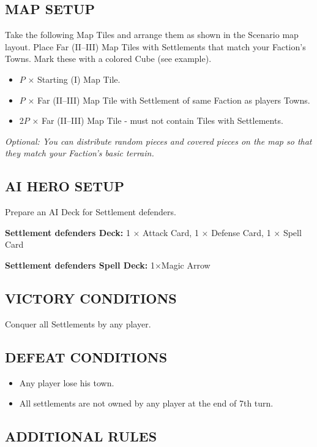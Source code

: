 \begin{multicols}{2}
\subsection*{\MakeUppercase{Map Setup}}

Take the following Map Tiles and arrange them as shown in the Scenario map layout.
Place Far (II--III) Map Tiles with Settlements that match your Faction's Towns. Mark these with a colored Cube (see example).

\begin{itemize}
  \item $P$ × Starting (I) Map Tile.
  \item $P$ × Far (II--III) Map Tile with Settlement of same Faction as players Towns.
  \item 2$P$ × Far (II--III) Map Tile - must not contain Tiles with Settlements.
\end{itemize}

\textit{Optional: You can distribute random pieces and covered pieces on the map so that they match your Faction's basic terrain.}

\subsection*{\MakeUppercase{AI Hero Setup}}

Prepare an AI Deck for Settlement defenders.

\textbf{Settlement defenders Deck:} 1 × Attack Card, 1 × Defense Card, 1 × Spell Card

\textbf{Settlement defenders Spell Deck:} 1×Magic Arrow

\subsection*{\MakeUppercase{Victory Conditions}}
Conquer all Settlements by any player.

\subsection*{\MakeUppercase{Defeat Conditions}}

\begin{itemize}
  \item Any player lose his town.
  \item All settlements are not owned by any player at the end of 7th turn.
\end{itemize}

\subsection*{\MakeUppercase{Additional Rules}}


\end{multicols}
